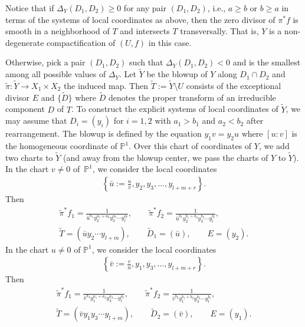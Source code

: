 \documentclass[pdftex]{sigma}
\newcommand{\PP}{\mathbb{P}}
\newcommand{\cpt}{compactification}
\begin{document}
Notice that if $\Delta_Y(D_1,D_2) \geq 0$ for any pair $(D_1, D_2)$, i.e., $a\geq b$ or $b\geq a$ in terms of the systems of local coordinates as above, then the zero divisor of $\pi^*f$ is smooth in a neighborhood of $T$
and intersects $T$ transversally. That is, $Y$ is a non-degenerate {\cpt} of $(U,f)$ in this case.

Otherwise, pick a pair $(D_1,D_2)$ such that $\Delta_Y(D_1,D_2) <0$ and is the smallest among all possible values of $\Delta_Y$. Let $\widetilde{Y}$ be the blowup of $Y$ along $D_1\cap D_2$ and $\tilde{\pi}\colon \widetilde{Y} \to X_1\times X_2$ the induced map. Then $\widetilde{T}:= \widetilde{Y}\setminus U$ consists of the exceptional divisor $E$ and $\{\widetilde{D}\}$ where $\widetilde{D}$ denotes the proper transform of an irreducible component $D$ of $T$. To construct the explicit systems of local coordinates of $\widetilde{Y}$, we may assume that $D_i = (y_i)$ for $i=1,2$ with $a_1 > b_1$ and $a_2 < b_2$ after rearrangement. The blowup is defined by the equation $y_1v=y_2u$ where $[u:v]$ is the homogeneous coordinate of $\PP^1$. Over this chart of coordinates of $Y$, we add two charts to $\widetilde{Y}$ (and away from the blowup center, we pass the charts of $Y$ to $\widetilde{Y}$). In the chart $v\neq 0$ of~$\PP^1$, we consider the local coordinates
\begin{gather}\label{eq:Yv_LocCoor}
\left\{ \bar{u}:= \frac{u}{v}, y_2, y_3, \dots, y_{l+m+r} \right\}.
\end{gather}
Then
\begin{gather}\label{eq:Yv_LocBeh}
\tilde{\pi}^*f_1 = \frac{1}{\bar{u}^{a_1}y_2^{a_1+a_2}	y_3^{a_3}\cdots y_l^{a_l}},\qquad \tilde{\pi}^*f_2 = \frac{1}{\bar{u}^{b_1}y_2^{b_1+b_2}	y_3^{b_3}\cdots y_l^{b_l}},
\\\widetilde{T} = (\bar{u}y_2\cdots y_{l+m}),\qquad \widetilde{D}_1 = (\bar{u}), \qquad E = (y_2).\nonumber \end{gather}
In the chart $u\neq 0$ of $\PP^1$, we consider the local coordinates
\begin{gather}\label{eq:Yu_LocCoor}
\left\{ \bar{v}:= \frac{v}{u}, y_1, y_3, \dots, y_{l+m+r} \right\}.
\end{gather}
Then
\begin{gather}\label{eq:Yu_LocBeh}
\tilde{\pi}^*f_1 = \frac{1}{\bar{v}^{a_2}y_1^{a_1+a_2}	y_3^{a_3}\cdots y_l^{a_l}},\qquad \tilde{\pi}^*f_2 = \frac{1}{\bar{v}^{b_2}y_1^{b_1+b_2}	y_3^{b_3}\cdots y_l^{b_l}},
\\ \widetilde{T} = (\bar{v}y_1y_3\cdots y_{l+m}),\qquad \widetilde{D}_2 = (\bar{v}), \qquad E = (y_1). \nonumber\end{gather}
\end{document}
